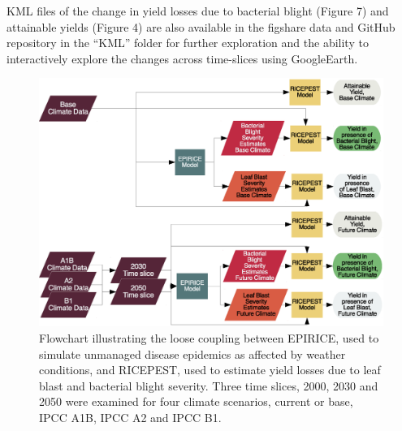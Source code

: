 KML files of the change in yield losses due to bacterial blight (Figure 7) and attainable yields (Figure 4) are also available in the figshare data and GitHub repository in the ``KML'' folder for further exploration and the ability to interactively explore the changes across time-slices using GoogleEarth.


\newpage
     \begin{figure}
     
      \includegraphics[width = 174mm]{figures/Simulation_Tree_Flowchart}
      \caption{Flowchart illustrating the loose coupling between EPIRICE, used to simulate unmanaged disease epidemics as affected by weather conditions, and RICEPEST, used to estimate yield losses due to leaf blast and bacterial blight severity. Three time slices, 2000, 2030 and 2050 were examined for four climate scenarios, current or base, IPCC A1B, IPCC A2 and IPCC B1.}
      \label{Flowchart}
    \end{figure} 

